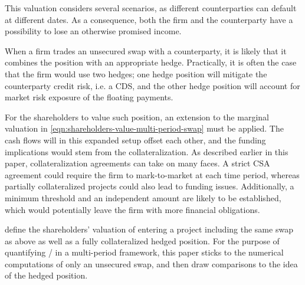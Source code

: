 \documentclass[main.tex]{subfiles}
\begin{document}
        This valuation considers several scenarios, as different counterparties can default at different dates.
        As a consequence, both the firm and the counterparty have a possibility to lose an otherwise promised income.

        When a firm trades an unsecured swap with a counterparty,
        it is likely that it combines the position with an appropriate hedge.
        Practically, it is often the case that the firm would use two hedges;
        one hedge position will mitigate the counterparty credit risk, i.e. a CDS,
        and the other hedge position will account for market risk exposure of the floating payments.

        For the shareholders to value such position,
        an extension to the marginal valuation in \cref{eqn:shareholders-value-multi-period-swap} must be applied.
        The cash flows will in this expanded setup offset each other,
        and the funding implications would stem from the collateralization.
        As described earlier in this paper, collateralization agreements can take on many faces.
        A strict CSA agreement could require the firm to mark-to-market at each time period,
        whereas partially collateralized projects could also lead to funding issues.
        Additionally, a minimum threshold and an independent amount are likely to be established,
        which would potentially leave the firm with more financial obligations.

        \textcite{ADS2018} define the shareholders' valuation of entering a project including the same swap as above as well as a fully collateralized hedged position.
        For the purpose of quantifying \FVA/ in a multi-period framework,
        this paper sticks to the numerical computations of only an unsecured swap,
        and then draw comparisons to the idea of the hedged position.
        
\end{document}
